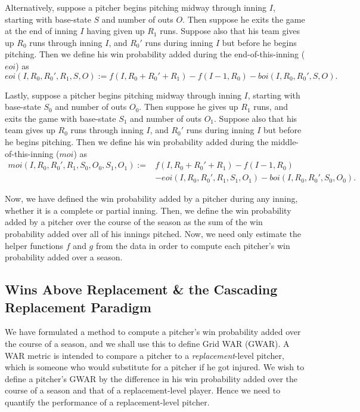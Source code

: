 \documentclass[12pt]{article}
\begin{document}
Alternatively, suppose a pitcher begins pitching midway through inning $I$, starting with base-state $S$ and number of outs $O$. Then suppose he exits the game at the end of inning $I$ having given up $R_1$ runs. Suppose also that his team gives up $R_0$ runs through inning $I$, and $R_0'$ runs during inning $I$ but before he begins pitching. Then we define his win probability added during the end-of-this-inning ($eoi$) as
$$eoi(I,R_0,R_0',R_1,S,O) := f(I,R_0+R_0'+R_1) - f(I-1,R_0) - boi(I,R_0,R_0',S,O) .$$

Lastly, suppose a pitcher begins pitching midway through inning $I$, starting with base-state $S_0$ and number of outs $O_0$. Then suppose he gives up $R_1$ runs, and exits the game with base-state $S_1$ and number of outs $O_1$. Suppose also that his team gives up $R_0$ runs through inning $I$, and $R_0'$ runs during inning $I$ but before he begins pitching. Then we define his win probability added during the middle-of-this-inning ($moi$) as
\begin{align*}
moi(I,R_0,R_0',R_1,S_0,O_0,S_1,O_1) := & f(I,R_0+R_0'+R_1) - f(I-1,R_0) \\
&- eoi(I,R_0,R_0',R_1,S_1,O_1) - boi(I,R_0,R_0',S_0,O_0).
\end{align*}

Now, we have defined the win probability added by a pitcher during any inning, whether it is a complete or partial inning. Then, we define the win probability added by a pitcher over the course of the season as the sum of the win probability added over all of his innings pitched. Now, we need only estimate the helper functions $f$ and $g$ from the data in order to compute each pitcher's win probability added over a season. 

\subsection{Wins Above Replacement \& the Cascading Replacement Paradigm}

We have formulated a method to compute a pitcher's win probability added over the course of a season, and we shall use this to define Grid WAR (GWAR). A WAR metric is intended to compare a pitcher to a \textit{replacement}-level pitcher, which is someone who would substitute for a pitcher if he got injured. We wish to define a pitcher's GWAR by the difference in his win probability added over the course of a season and that of a replacement-level player. Hence we need to quantify the performance of a replacement-level pitcher.
\end{document}
